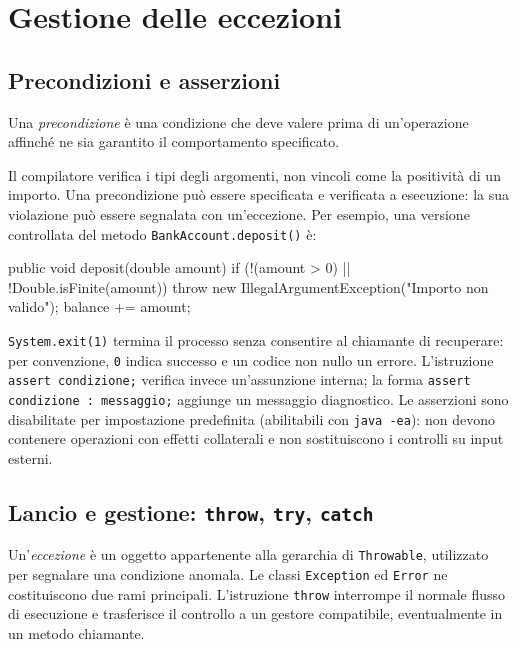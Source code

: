 \section{Gestione delle eccezioni}
\label{sec:fi-java-file-eccezioni}

\subsection{Precondizioni e asserzioni}
\label{sec:fi-java-file-precondizioni}

\begin{definition}[Precondizione]
\label{def:fi-java-file-precondizione}
Una \emph{precondizione} è una condizione che deve valere prima
di un'operazione affinché ne sia garantito il comportamento
specificato.
\end{definition}

Il compilatore verifica i tipi degli argomenti, non vincoli come
la positività di un importo. Una precondizione può essere
specificata e verificata a esecuzione: la sua violazione può
essere segnalata con un'eccezione. Per esempio, una versione
controllata del metodo \texttt{BankAccount.deposit()} è:

\begin{unipdcode}[language=Java]
public void deposit(double amount) {
    if (!(amount > 0) || !Double.isFinite(amount)) {
        throw new IllegalArgumentException("Importo non valido");
    }
    balance += amount;
}
\end{unipdcode}

\texttt{System.exit(1)} termina il processo senza consentire
al chiamante di recuperare: per convenzione, \texttt{0} indica
successo e un codice non nullo un errore. L'istruzione
\texttt{assert condizione;} verifica invece un'assunzione interna;
la forma \texttt{assert condizione : messaggio;} aggiunge un
messaggio diagnostico. Le asserzioni sono disabilitate per impostazione
predefinita (abilitabili con \texttt{java -ea}): non devono
contenere operazioni con effetti collaterali e non sostituiscono
i controlli su input esterni.

\subsection{Lancio e gestione: \texttt{throw}, \texttt{try}, \texttt{catch}}
\label{sec:fi-java-file-throw-try-catch}

\begin{definition}[Eccezione]
\label{def:fi-java-file-eccezione}
Un'\emph{eccezione} è un oggetto appartenente alla gerarchia
di \texttt{Throwable}, utilizzato per segnalare una condizione
anomala. Le classi \texttt{Exception} ed \texttt{Error} ne
costituiscono due rami principali. L'istruzione
\texttt{throw} interrompe il normale flusso di esecuzione e
trasferisce il controllo a un gestore compatibile, eventualmente
in un metodo chiamante.
\end{definition}

